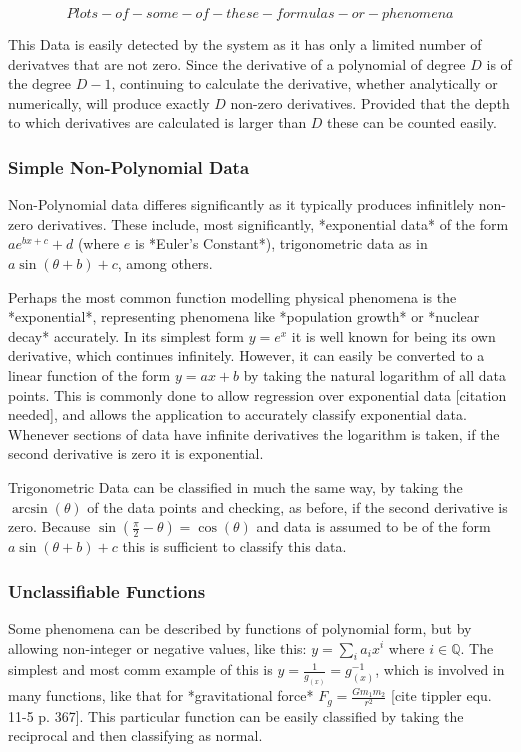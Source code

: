 \documentclass[main.tex]{subfiles}
\begin{document}
  \[Plots-of-some-of-these-formulas-or-phenomena\]
  
  This Data is easily detected by  the system as it has only a limited number of derivatves that are not zero. Since the derivative of a polynomial of degree $D$ is of the degree $D-1$, continuing to calculate the derivative, whether analytically or numerically, will produce exactly $D$ non-zero derivatives. Provided that the depth to which derivatives are calculated is larger than $D$ these can be counted easily.
  
  \subsubsection{Simple Non-Polynomial Data}
  
  Non-Polynomial data differes significantly as it typically produces infinitlely non-zero derivatives. These include, most significantly, *exponential data* of the form $a e^{b x + c} + d$ (where $e$ is *Euler's Constant*), trigonometric data as in $a \sin(\theta +b) + c$, among others. 
  
  Perhaps the most common function modelling physical phenomena is the *exponential*, representing phenomena like *population growth* or *nuclear decay* accurately.  In its simplest form $y=e^x$ it is well known for being its own derivative, which continues infinitely. However, it can easily be converted to a linear function of the form $y=a x+b$ by taking the natural logarithm of all data points. This is commonly done to allow regression over exponential data [citation needed], and allows the application to accurately classify exponential data. Whenever sections of data have infinite derivatives the logarithm is taken, if the second derivative is zero it is exponential.
  
  Trigonometric Data  can be classified in much the same way, by taking the $\arcsin(\theta)$ of the data points and checking, as before, if the second derivative is zero. Because $\sin(\frac{\pi}{2}-\theta)=\cos(\theta)$ and data is assumed to be of the form $a \sin( \theta + b)+c$ this is sufficient to classify this data.
  
  \subsubsection{Unclassifiable Functions}
  
  Some phenomena can be described by functions of polynomial form, but by allowing non-integer or negative values, like this: $y=\sum_i a_i x^i$ where $i \in \mathbb{Q} $.   The simplest and most comm example of this is $y=\frac{1}{g_{(x)}}=g_{(x)}^{-1}$, which is involved in many functions, like that for *gravitational force* $F_g=\frac{G m_1 m_2}{r^2}$ [cite tippler equ. 11-5 p. 367]. This particular function can be easily classified by taking the reciprocal and then classifying as normal.
  
\end{document}
